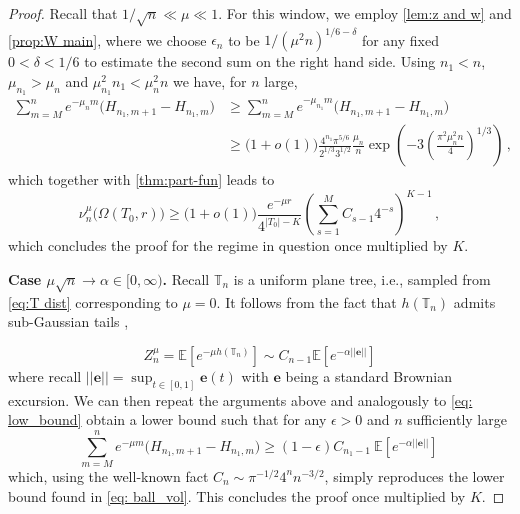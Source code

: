 \documentclass{article}
\newcommand{\bb}{\begin{equation}}
\newcommand{\ee}{\end{equation}}
\newcommand{\E}{\mathbb{E}}								%
\newcommand{\1}{\mathbbm{1}}								%
\theoremstyle{definition}
\numberwithin{equation}{section}
\newcommand{\T}{\mathbb T}
\begin{document}
\begin{proof}
Recall that $1/\sqrt{n} \ll \mu \ll 1$. For this window, we employ \cref{lem:z and w} and \cref{prop:W main}, where we choose $\epsilon_n$ to be $1/(\mu^2n)^{1/6 -\delta}$ for any fixed $0< \delta < 1/6$ to estimate the second sum on the right hand side. Using $n_1 < n$, $\mu_{n_1}> \mu_n$ and $\mu^2_{n_1}n_1 < \mu^2 _n n$ we have, for $n$ large,
\begin{align} \label{eq: low_bound}
\sum_{m=M} ^n e^{-\mu_n m} \big(H_{n_1,m+1}-H_{n_1,m}\big) &\geq \sum_{m=M} ^n e^{-\mu_{n_1} m} \big(H_{n_1,m+1}-H_{n_1,m}\big)\nonumber \\
&\geq\big(1+ o(1)\big)  \frac{4^{n_1}\pi ^{5/6}}{2^{1/3} 3^{1/2}} \frac{\mu_n}{n} \exp{\left( -3\left( \frac{\pi^2 \mu_n ^2 n}{4} \right)^{1/3} \right)}\,,
\end{align}
which together with \cref{thm:part-fun} leads to
\bb \label{eq: ball_vol}
\nu^\mu _n \big(\Omega(T_0,r)\big) \geq \big(1 + o(1)\big) \frac{e^{-\mu r }}{4^{|T_0|-K}} \left( \sum_{s=1} ^M C_{s-1} 4^{-s} \right)^{K-1}\,,
\ee
which concludes the proof for the regime in question once multiplied by $K$.

\smallskip


\noindent \textbf{Case $\mu \sqrt{n} \to \alpha \in [0,\infty)$.} Recall $\T_n$ is a uniform plane tree, i.e., sampled from \eqref{eq:T dist} corresponding to $\mu=0$. It follows from the fact that $h(\T_n)$ admits sub-Gaussian tails \cite[Theorem 1.2]{LAB_LD_SJ_13},

$$
Z_n ^\mu = \E\left[e^{-\mu h(\T_n)}\right] \sim C_{n-1} \E \left[e^{-\alpha ||\mathbf{e}||}\right] 
$$
where recall $||\mathbf{e}||= \sup_{t \in[0,1]} \mathbf{e}(t)$ with $\mathbf{e}$ being a standard Brownian excursion. We can then repeat the arguments above and analogously to \eqref{eq: low_bound} obtain a lower bound such that for any $\epsilon >0$ and $n$ sufficiently large
$$\sum_{m=M} ^n e^{-\mu m} \big(H_{n_1,m+1}-H_{n_1,m}\big) \geq (1 - \epsilon)C_{n_1 -1} ~ \E \left[ e^{-\alpha ||\mathbf{e}||} \right]  \,  $$
which, using the well-known fact $C_n \sim \pi^{-1/2} 4^n n^{-3/2}$, simply reproduces the lower bound found in \eqref{eq: ball_vol}. This concludes the proof once multiplied by $K$.
\end{proof}
\end{document}
